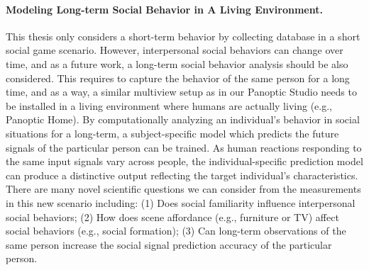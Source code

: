 \paragraph{Modeling Long-term Social Behavior in A Living Environment.}
This thesis only considers a short-term behavior by collecting database in a short social game scenario. However, interpersonal social behaviors can change over time, and as a future work, a long-term social behavior analysis should be also considered. This requires to capture the behavior of the same person for a long time, and as a way, a similar multiview setup as in our Panoptic Studio needs to be installed in a living environment where humans are actually living (e.g., Panoptic Home). By computationally analyzing an individual's behavior in social situations for a long-term, a subject-specific model which predicts the future signals of the particular person can be trained. As human reactions responding to the same input signals vary across people, the individual-specific prediction model can produce a distinctive output reflecting the target individual's characteristics. There are many novel scientific questions we can consider from the measurements in this new scenario including: (1) Does social familiarity influence interpersonal social behaviors; (2) How does scene affordance (e.g., furniture or TV) affect social behaviors (e.g., social formation); (3) Can long-term observations of the same person increase the social signal prediction accuracy of the particular person. 
